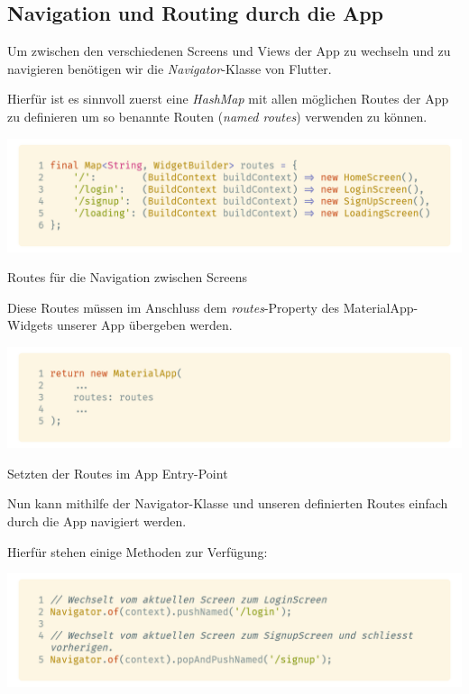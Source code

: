 \subsection{Navigation und Routing durch die App}

Um zwischen den verschiedenen Screens und Views der App zu wechseln und zu navigieren benötigen wir die \textit{Navigator}-Klasse von Flutter.

Hierfür ist es sinnvoll zuerst eine \textit{HashMap} mit allen möglichen Routes der App zu definieren
um so benannte Routen (\textit{named routes}) verwenden zu können.

\begin{code}
    \centering
    \includegraphics[width=1\textwidth]{images/Flutter/flutterRoutes.png}
    \vspace{-25pt}
    \caption{Routes für die Navigation zwischen Screens}
\end{code}

\newpage

Diese Routes müssen im Anschluss dem \textit{routes}-Property des MaterialApp-Widgets unserer App übergeben werden.

\begin{code}
    \centering
    \includegraphics[width=1\textwidth]{images/Flutter/flutterMainRoute.png}
    \vspace{-25pt}
    \caption{Setzten der Routes im App Entry-Point}
\end{code}

Nun kann mithilfe der Navigator-Klasse und unseren definierten Routes einfach durch die App navigiert werden.

Hierfür stehen einige Methoden zur Verfügung:

\begin{code}
    \centering
    \includegraphics[width=1\textwidth]{images/Flutter/flutterNavigatorOf.png}
    \vspace{-25pt}
    \caption{\lstinline{Navigator.of()}-Funktion zum Wechseln der Screens per \textit{namedRoutes}}
\end{code}

